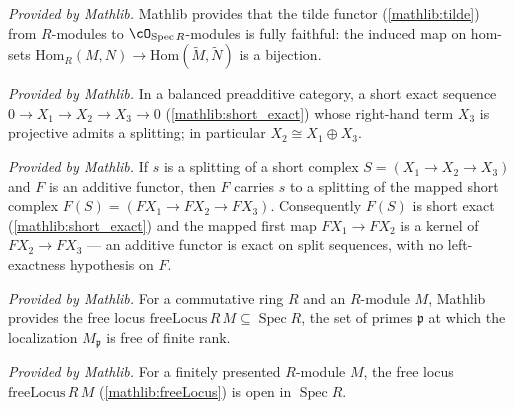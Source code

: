 \begin{lemma}
  \label{mathlib:tilde_fullyFaithful}
  \mathlibok
  \textit{Provided by Mathlib.}
  Mathlib provides that the tilde functor (\cref{mathlib:tilde}) from
  \(R\)-modules to \(\cO_{\operatorname{Spec}R}\)-modules is fully faithful: the
  induced map on hom-sets
  \(\mathrm{Hom}_R(M,N)\to\mathrm{Hom}(\widetilde M,\widetilde N)\) is a bijection.
\end{lemma}

\begin{lemma}
  \label{mathlib:splittingOfProjective}
  \mathlibok
  \textit{Provided by Mathlib.}
  In a balanced preadditive category, a short exact sequence
  \(0\to X_1\to X_2\to X_3\to 0\) (\cref{mathlib:short_exact}) whose right-hand
  term \(X_3\) is projective admits a splitting; in particular
  \(X_2\cong X_1\oplus X_3\).
\end{lemma}

\begin{lemma}
  \label{mathlib:splitting_map}
  \mathlibok
  \textit{Provided by Mathlib.}
  If \(s\) is a splitting of a short complex \(S=(X_1\to X_2\to X_3)\) and
  \(F\) is an additive functor, then \(F\) carries \(s\) to a splitting of the
  mapped short complex \(F(S)=(FX_1\to FX_2\to FX_3)\).  Consequently \(F(S)\) is
  short exact (\cref{mathlib:short_exact}) and the mapped first map \(FX_1\to FX_2\)
  is a kernel of \(FX_2\to FX_3\) — an additive functor is exact on split sequences,
  with no left-exactness hypothesis on \(F\).
\end{lemma}

\begin{definition}
  \label{mathlib:freeLocus}
  \mathlibok
  \textit{Provided by Mathlib.}
  For a commutative ring \(R\) and an \(R\)-module \(M\), Mathlib provides the free
  locus \(\mathrm{freeLocus}\,R\,M\subseteq\operatorname{Spec}R\), the set of primes
  \(\mathfrak p\) at which the localization \(M_{\mathfrak p}\) is free of finite
  rank.
\end{definition}

\begin{lemma}
  \label{mathlib:isOpen_freeLocus}
  \mathlibok
  \textit{Provided by Mathlib.}
  For a finitely presented \(R\)-module \(M\), the free locus
  \(\mathrm{freeLocus}\,R\,M\) (\cref{mathlib:freeLocus}) is open in
  \(\operatorname{Spec}R\).
\end{lemma}


